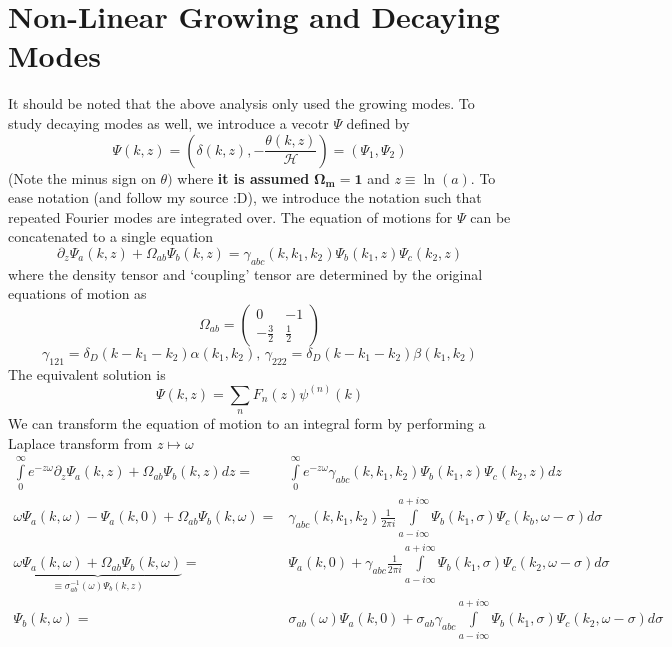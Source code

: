 \section{Non-Linear Growing and Decaying Modes}
It should be noted that the above analysis only used the growing modes. To study decaying modes as well, we introduce a vecotr $\Psi$ defined by
\begin{equation}
	\Psi(k,z) = \left(\delta(k,z),-\frac{\theta(k,z)}{\mathcal{H}}\right) = \left( \Psi_1, \Psi_2 \right)
\end{equation}
(Note the minus sign on $\theta)$ where \textbf{it is assumed} $\mathbf{\Omega_m = 1}$ and $z\equiv\ln(a)$. To ease notation (and follow my source :D), we introduce the notation such that repeated Fourier modes are integrated over. The equation of motions for $\Psi$ can be concatenated to a single equation
\begin{equation}
	\partial_z\Psi_a(k,z) + \Omega_{ab}\Psi_b(k,z) = \gamma_{abc}(k,k_1,k_2)\Psi_b(k_1,z)\Psi_c(k_2,z)
\end{equation}
where the density tensor and `coupling' tensor are determined by the original equations of motion as
\begin{equation}
	\Omega_{ab} = \left(\begin{array}{cc}
	0 & -1 \\
	-\frac{3}{2} & \frac{1}{2}
	\end{array}
	\right)
\end{equation}
\begin{equation}
	\gamma_{121} = \delta_D(k-k_1-k_2)\alpha(k_1,k_2), \, \gamma_{222} = \delta_D(k-k_1-k_2)\beta(k_1,k_2)
\end{equation}
The equivalent solution is
\begin{equation}
	\Psi(k,z) = \sum_n F_n(z)\psi^{(n)}(k)
\end{equation}
We can transform the equation of motion to an integral form by performing a Laplace transform from $z\mapsto\omega$
\begin{equation}
	\begin{split}
		\int\limits_0^\infty e^{-z\omega}\partial_z\Psi_a(k,z) + \Omega_{ab}\Psi_b(k,z) dz =& \int\limits_{0}^{\infty} e^{-z\omega} \gamma_{abc}(k,k_1,k_2)\Psi_b(k_1,z)\Psi_c(k_2,z) dz\\
		\omega\Psi_a(k,\omega) - \Psi_{a}(k,0) + \Omega_{ab}\Psi_b(k,\omega) =& \gamma_{abc}(k,k_1,k_2)\frac{1}{2\pi i}\int\limits_{a-i\infty}^{a+i\infty}\Psi_b(k_1,\sigma)\Psi_c(k_b,\omega-\sigma)d\sigma \\
		\underbrace{\omega\Psi_a(k,\omega) + \Omega_{ab}\Psi_b(k,\omega)}_{\equiv \sigma^{-1}_{ab}(\omega)\Psi_b(k,z)} =& \Psi_a(k,0) + \gamma_{abc}\frac{1}{2\pi i} \int\limits_{a-i\infty}^{a+i\infty}\Psi_b(k_1,\sigma)\Psi_c(k_2,\omega-\sigma)d\sigma \\
		\Psi_b(k,\omega) =& \sigma_{ab}(\omega)\Psi_{a}(k,0) + \sigma_{ab}\gamma_{abc}\int\limits_{a-i\infty}^{a+i\infty}\Psi_b(k_1,\sigma)\Psi_c(k_2,\omega-\sigma)d\sigma \\
	\end{split}
\end{equation}
